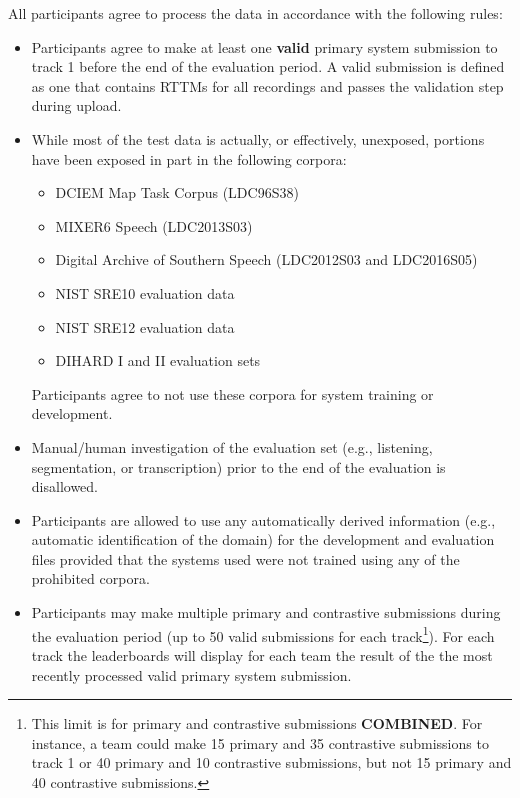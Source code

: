 \documentclass{article}
\begin{document}
All participants agree to process the data in accordance with the following rules:
\begin{itemize}
    \item Participants agree to make at least one {\bf valid} primary system submission to track 1 before the end of the evaluation period. A valid submission is defined as one that contains RTTMs for all recordings and passes the validation step during upload.
    \item While most of the test data is actually, or effectively, unexposed, portions have been exposed in part in the following corpora:
    	\begin{itemize}
            \item DCIEM Map Task Corpus (LDC96S38)
            \item MIXER6 Speech (LDC2013S03)
            \item Digital Archive of Southern Speech (LDC2012S03 and LDC2016S05)
			\item NIST SRE10 evaluation data
            \item NIST SRE12 evaluation data
            \item DIHARD I and II evaluation sets
        \end{itemize}
        Participants agree to not use these corpora for system training or development.
    \item Manual/human investigation of the evaluation set (e.g., listening, segmentation, or transcription) prior to the end of the evaluation is disallowed.
    \item Participants are allowed to use any automatically derived information  (e.g., automatic identification of the domain) for the development and evaluation files provided that the systems used were not trained using any of the prohibited corpora.
    \item Participants may make multiple primary and contrastive submissions during the evaluation period (up to 50 valid submissions for each track\footnote{This limit is for primary and contrastive submissions {\bf COMBINED}. For instance, a team could make 15 primary and 35 contrastive submissions to track 1 or 40 primary and 10 contrastive submissions, but not 15 primary and 40 contrastive submissions.}).  For each track the leaderboards will display for each team the result of the the most recently processed valid primary system submission. 
\end{itemize}
\end{document}
